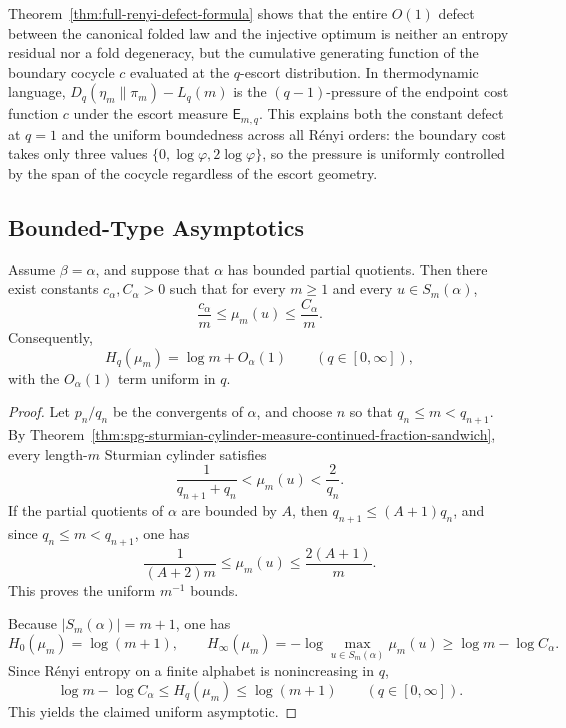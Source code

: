 \begin{remark}
\label{rem:escort-pressure-interpretation}
Theorem~\ref{thm:full-renyi-defect-formula} shows that the entire
\(O(1)\) defect between the canonical folded law and the injective optimum
is neither an entropy residual nor a fold degeneracy, but the cumulative
generating function of the boundary cocycle \(c\) evaluated at the
\(q\)-escort distribution. In thermodynamic language,
\(D_q(\eta_m\|\pi_m)-L_q(m)\) is the \((q-1)\)-pressure of the endpoint
cost function \(c\) under the escort measure \(\mathsf{E}_{m,q}\). This
explains both the constant defect at \(q=1\) and the uniform boundedness
across all R\'enyi orders: the boundary cost takes only three values
\(\{0,\log\varphi,2\log\varphi\}\), so the pressure is uniformly controlled
by the span of the cocycle regardless of the escort geometry.
\end{remark}

\subsection{Bounded-Type Asymptotics}

\begin{proposition}\label{prop:bounded-type-sturmian-entropy}
Assume \(\beta=\alpha\), and suppose that \(\alpha\) has bounded partial
quotients. Then there exist
constants \(c_\alpha,C_\alpha>0\) such that for
every \(m\ge 1\) and every \(u\in S_m(\alpha)\),
\[
\frac{c_\alpha}{m}\le \mu_m(u)\le \frac{C_\alpha}{m}.
\]
Consequently,
\[
H_q(\mu_m)=\log m+O_\alpha(1)
\qquad (q\in[0,\infty]),
\]
with the \(O_\alpha(1)\) term uniform in \(q\).
\end{proposition}

\begin{proof}
Let \(p_n/q_n\) be the convergents of \(\alpha\), and choose \(n\) so that
\(q_n\le m<q_{n+1}\). By
Theorem~\ref{thm:spg-sturmian-cylinder-measure-continued-fraction-sandwich},
every length-\(m\) Sturmian cylinder satisfies
\[
\frac{1}{q_{n+1}+q_n}<\mu_m(u)<\frac{2}{q_n}.
\]
If the partial quotients of \(\alpha\) are bounded by \(A\), then
\(q_{n+1}\le (A+1)q_n\), and since \(q_n\le m<q_{n+1}\), one has
\[
\frac{1}{(A+2)m}\le \mu_m(u)\le \frac{2(A+1)}{m}.
\]
This proves the uniform \(m^{-1}\) bounds.

Because \(|S_m(\alpha)|=m+1\), one has
\[
H_0(\mu_m)=\log(m+1),
\qquad
H_\infty(\mu_m)=-\log\max_{u\in S_m(\alpha)}\mu_m(u)\ge \log m-\log C_\alpha.
\]
Since R\'enyi entropy on a finite alphabet is nonincreasing in \(q\),
\[
\log m-\log C_\alpha
\le
H_q(\mu_m)
\le
\log(m+1)
\qquad (q\in[0,\infty]).
\]
This yields the claimed uniform asymptotic.
\end{proof}


